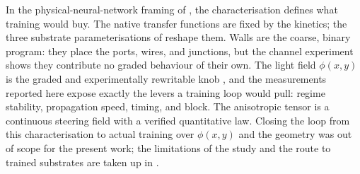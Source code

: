 In the physical-neural-network framing of , the characterisation defines what training would buy.
The native transfer functions are fixed by the kinetics; the three substrate parameterisations of  reshape them.
Walls are the coarse, binary program: they place the ports, wires, and junctions, but the channel experiment shows they contribute no graded behaviour of their own.
The light field $\phi(x,y)$ is the graded and experimentally rewritable knob \cite{sakurai2002design}, and the measurements reported here expose exactly the levers a training loop would pull: regime stability, propagation speed, timing, and block.
The anisotropic tensor is a continuous steering field with a verified quantitative law.
Closing the loop from this characterisation to actual training over $\phi(x,y)$ and the geometry was out of scope for the present work; the limitations of the study and the route to trained substrates are taken up in .
